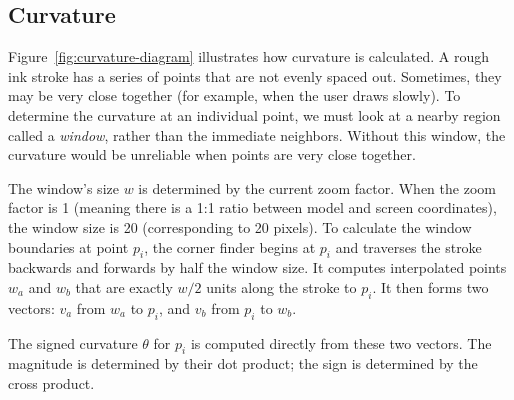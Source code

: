 \subsection{Curvature}



Figure~\ref{fig:curvature-diagram} illustrates how curvature is
calculated. A rough ink stroke has a series of points that are not
evenly spaced out. Sometimes, they may be very close together (for
example, when the user draws slowly). To determine the curvature at an
individual point, we must look at a nearby region called a
\textit{window}, rather than the immediate neighbors. Without this
window, the curvature would be unreliable when points are very close
together.

The window's size $w$ is determined by the current zoom factor. When
the zoom factor is 1 (meaning there is a 1:1 ratio between model and
screen coordinates), the window size is 20 (corresponding to 20
pixels). To calculate the window boundaries at point $p_i$, the corner
finder begins at $p_i$ and traverses the stroke backwards and forwards
by half the window size. It computes interpolated points $w_a$ and
$w_b$ that are exactly $w/2$ units along the stroke to $p_i$. It then
forms two vectors: $v_a$ from $w_a$ to $p_i$, and $v_b$ from $p_i$ to
$w_b$.

The signed curvature $\theta$ for $p_i$ is computed directly from
these two vectors. The magnitude is determined by their dot product;
the sign is determined by the cross product.

